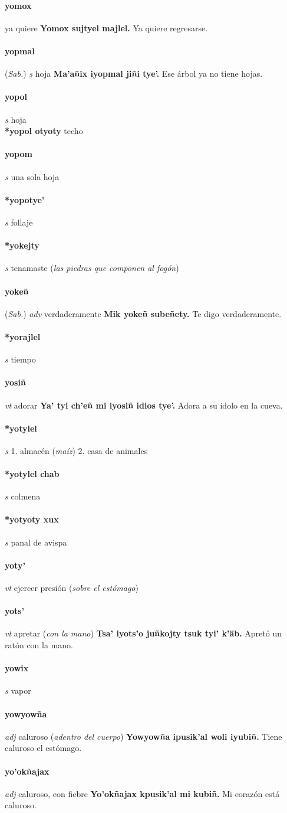 \documentclass{scrbook}
\newcommand{\entry}[1]{\paragraph{#1}}
\newcommand{\onedefinition}[1]{#1.}
\newcommand{\partofspeech}[1]{\textit{#1}}
\newcommand{\spanishtranslation}[1]{#1}
\newcommand{\clarification}[1]{(\textit{#1})}
\newcommand{\cholexample}[1]{\textbf{#1}}
\newcommand{\exampletranslation}[1]{#1}
\newcommand{\relevantdialect}[1]{(\textit{#1})}
\newcommand{\secondaryentry}[1]{\\\textbf{#1}}
\newcommand{\secondtranslation}[1]{#1}
\begin{document}
\begin{multicols}{2}
\entry{yomox}
\spanishtranslation{ya quiere}
\cholexample{Yomox sujtyel majlel.}
\exampletranslation{Ya quiere regresarse.}

\entry{yopmal}
\relevantdialect{Sab.}
\partofspeech{s}
\spanishtranslation{hoja}
\cholexample{Ma'añix iyopmal jiñi tye'.}
\exampletranslation{Ese árbol ya no tiene hojas.}

\entry{yopol}
\partofspeech{s}
\spanishtranslation{hoja}
\secondaryentry{*yopol otyoty}
\secondtranslation{techo}

\entry{yopom}
\partofspeech{s}
\spanishtranslation{una sola hoja}

\entry{*yopotye'}
\partofspeech{s}
\spanishtranslation{follaje}

\entry{*yokejty}
\partofspeech{s}
\spanishtranslation{tenamaste}
\clarification{las piedras que componen al fogón}

\entry{yokeñ}
\relevantdialect{Sab.}
\partofspeech{adv}
\spanishtranslation{verdaderamente}
\cholexample{Mik yokeñ subeñety.}
\exampletranslation{Te digo verdaderamente.}

\entry{*yorajlel}
\partofspeech{s}
\spanishtranslation{tiempo}

\entry{yosiñ}
\partofspeech{vt}
\spanishtranslation{adorar}
\cholexample{Ya' tyi ch'eñ mi iyosiñ idios tye'.}
\exampletranslation{Adora a su ídolo en la cueva.}

\entry{*yotylel}
\partofspeech{s}
\onedefinition{1}
\spanishtranslation{almacén}
\clarification{maíz}
\onedefinition{2}
\spanishtranslation{casa de animales}

\entry{*yotylel chab}
\partofspeech{s}
\spanishtranslation{colmena}

\entry{*yotyoty xux}
\partofspeech{s}
\spanishtranslation{panal de avispa}

\entry{yoty'}
\partofspeech{vt}
\spanishtranslation{ejercer presión}
\clarification{sobre el estómago}

\entry{yots'}
\partofspeech{vt}
\spanishtranslation{apretar}
\clarification{con la mano}
\cholexample{Tsa' iyots'o juñkojty tsuk tyi' k'äb.}
\exampletranslation{Apretó un ratón con la mano.}

\entry{yowix}
\partofspeech{s}
\spanishtranslation{vapor}

\entry{yowyowña}
\partofspeech{adj}
\spanishtranslation{caluroso}
\clarification{adentro del cuerpo}
\cholexample{Yowyowña ipusik'al woli iyubiñ.}
\exampletranslation{Tiene caluroso el estómago.}

\entry{yo'okñajax}
\partofspeech{adj}
\spanishtranslation{caluroso, con fiebre}
\cholexample{Yo'okñajax kpusik'al mi kubiñ.}
\exampletranslation{Mi corazón está caluroso.}


\end{multicols}
\end{document}
